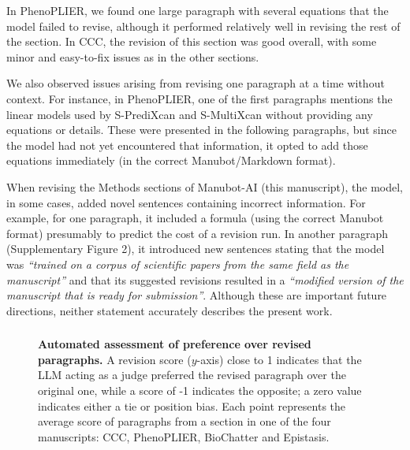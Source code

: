 \documentclass[
]{article}
\providecommand{\DIFaddtex}[1]{{\protect\color{blue}\uwave{#1}}} %
\providecommand{\DIFaddbegin}{} %
\providecommand{\DIFadd}[1]{\texorpdfstring{\DIFaddtex{#1}}{#1}} %
\newcommand{\DIFaddincludegraphics}[2][]{{\color{blue}\fbox{\DIFOincludegraphics[#1]{#2}}}} %
\DeclareRobustCommand{\DIFaddbegin}{\DIFOaddbegin \let\includegraphics\DIFaddincludegraphics} %
\begin{document}
In PhenoPLIER, we found one large paragraph with several equations that the model failed to revise, although it performed relatively well in revising the rest of the section.
In CCC, the revision of this section was good overall, with some minor and easy-to-fix issues as in the other sections.

We also observed issues arising from revising one paragraph at a time without context.
For instance, in PhenoPLIER, one of the first paragraphs mentions the linear models used by S-PrediXcan and S-MultiXcan without providing any equations or details.
These were presented in the following paragraphs, but since the model had not yet encountered that information, it opted to add those equations immediately (in the correct Manubot/Markdown format).

% 

When revising the Methods sections of Manubot-AI (this manuscript), the model, in some cases, added novel sentences containing incorrect information.
For example, for one paragraph, it included a formula (using the correct Manubot format) presumably to predict the cost of a revision run.
In another paragraph (Supplementary Figure 2), it introduced new sentences stating that the model was \emph{``trained on a corpus of scientific papers from the same field as the manuscript''} and that its suggested revisions resulted in a \emph{``modified version of the manuscript that is ready for submission''}.
Although these are important future directions, neither statement accurately describes the present work.

\DIFaddbegin \subsubsection{\DIFadd{Automated assessments}}

\begin{figure}
\hypertarget{fig:llm_judge}{%
\centering

\caption{\textbf{Automated assessment of preference over revised paragraphs.}
A revision score (\(y\)-axis) close to 1 indicates that the LLM acting as a judge preferred the revised paragraph over the original one, while a score of -1 indicates the opposite; a zero value indicates either a tie or position bias.
Each point represents the average score of paragraphs from a section in one of the four manuscripts: CCC, PhenoPLIER, BioChatter and Epistasis.}\label{fig:llm_judge}
}
\end{figure}
\end{document}
